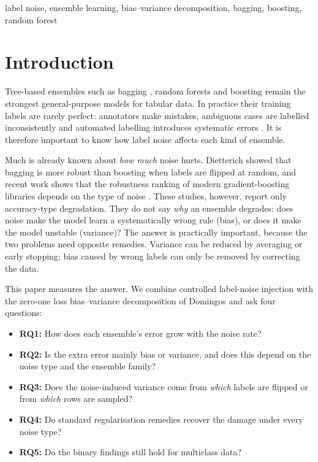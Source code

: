 \documentclass[conference,a4paper]{IEEEtran}
\begin{document}
\begin{IEEEkeywords}
label noise, ensemble learning, bias--variance decomposition, bagging, boosting, random forest
\end{IEEEkeywords}

\section{Introduction}
Tree-based ensembles such as bagging \cite{breiman1996}, random forests \cite{breiman2001} and boosting \cite{freund1997,friedman2001,chen2016} remain the strongest general-purpose models for tabular data. In practice their training labels are rarely perfect: annotators make mistakes, ambiguous cases are labelled inconsistently and automated labelling introduces systematic errors \cite{frenay2014}. It is therefore important to know how label noise affects each kind of ensemble.

Much is already known about \emph{how much} noise hurts. Dietterich \cite{dietterich2000} showed that bagging is more robust than boosting when labels are flipped at random, and recent work shows that the robustness ranking of modern gradient-boosting libraries depends on the type of noise \cite{morampudi2026}. These studies, however, report only accuracy-type degradation. They do not say \emph{why} an ensemble degrades: does noise make the model learn a systematically wrong rule (bias), or does it make the model unstable (variance)? The answer is practically important, because the two problems need opposite remedies. Variance can be reduced by averaging or early stopping; bias caused by wrong labels can only be removed by correcting the data.

This paper measures the answer. We combine controlled label-noise injection with the zero-one loss bias--variance decomposition of Domingos \cite{domingos2000} and ask four questions:
\begin{itemize}
\item \textbf{RQ1:} How does each ensemble's error grow with the noise rate?
\item \textbf{RQ2:} Is the extra error mainly bias or variance, and does this depend on the noise type and the ensemble family?
\item \textbf{RQ3:} Does the noise-induced variance come from \emph{which} labels are flipped or from \emph{which} rows are sampled?
\item \textbf{RQ4:} Do standard regularisation remedies recover the damage under every noise type?
\item \textbf{RQ5:} Do the binary findings still hold for multiclass data?
\end{itemize}
\end{document}
